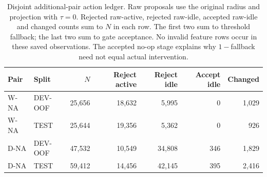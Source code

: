 \begin{table}[htbp]
\centering\footnotesize\setlength{\tabcolsep}{3pt}
\caption{Disjoint additional-pair action ledger. Raw proposals use the original radius and projection with $\tau=0$. Rejected raw-active, rejected raw-idle, accepted raw-idle and changed counts sum to $N$ in each row. The first two sum to threshold fallback; the last two sum to gate acceptance. No invalid feature rows occur in these saved observations. The accepted no-op stage explains why $1-$fallback need not equal actual intervention.}
\label{tab:scope-stages}
\begin{tabular}{llrrrrr}
\toprule
Pair & Split & $N$ & Reject active & Reject idle & Accept idle & Changed\\
\midrule
W-NA & DEV-OOF & 25,656 & 18,632 & 5,995 & 0 & 1,029\\
W-NA & TEST & 25,644 & 19,356 & 5,362 & 0 & 926\\
D-NA & DEV-OOF & 47,532 & 10,549 & 34,808 & 346 & 1,829\\
D-NA & TEST & 59,412 & 14,456 & 42,145 & 395 & 2,416\\
\bottomrule
\end{tabular}
\end{table}
